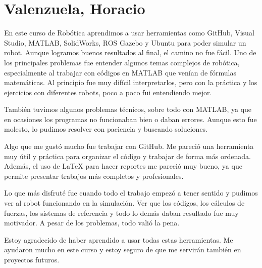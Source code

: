 \section{Valenzuela, Horacio}
En este curso de Robótica aprendimos a usar herramientas como GitHub, Visual Studio, MATLAB, SolidWorks, ROS Gazebo y Ubuntu para poder simular un robot. Aunque logramos buenos resultados al final, el camino no fue fácil. Uno de los principales problemas fue entender algunos temas complejos de robótica, especialmente al trabajar con códigos en MATLAB que venían de fórmulas matemáticas. Al principio fue muy difícil interpretarlos, pero con la práctica y los ejercicios con diferentes robots, poco a poco fui entendiendo mejor.

También tuvimos algunos problemas técnicos, sobre todo con MATLAB, ya que en ocasiones los programas no funcionaban bien o daban errores. Aunque esto fue molesto, lo pudimos resolver con paciencia y buscando soluciones.

Algo que me gustó mucho fue trabajar con GitHub. Me pareció una herramienta muy útil y práctica para organizar el código y trabajar de forma más ordenada. Además, el uso de LaTeX para hacer reportes me pareció muy bueno, ya que permite presentar trabajos más completos y profesionales.

Lo que más disfruté fue cuando todo el trabajo empezó a tener sentido y pudimos ver al robot funcionando en la simulación. Ver que los códigos, los cálculos de fuerzas, los sistemas de referencia y todo lo demás daban resultado fue muy motivador. A pesar de los problemas, todo valió la pena.

Estoy agradecido de haber aprendido a usar todas estas herramientas. Me ayudaron mucho en este curso y estoy seguro de que me servirán también en proyectos futuros.